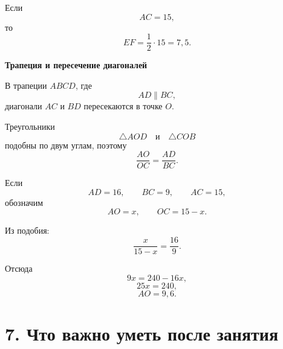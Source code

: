 \documentclass[a4paper,12pt]{article}
\newcommand{\keyidea}[1]{%
    \medskip
    {\color{darkaccent}\bfseries #1}
    \smallskip
}
\begin{document}
Если
\[
AC=15,
\]
то
\[
EF=
\frac12\cdot15
=
\boxed{7{,}5}.
\]

\begin{center}


\end{center}

\keyidea{Трапеция и пересечение диагоналей}

В трапеции \(ABCD\), где
\[
AD\parallel BC,
\]
диагонали \(AC\) и \(BD\) пересекаются в точке \(O\).

Треугольники
\[
\triangle AOD
\quad\text{и}\quad
\triangle COB
\]
подобны по двум углам, поэтому
\[
\boxed{
\frac{AO}{OC}
=
\frac{AD}{BC}
}.
\]

Если
\[
AD=16,\qquad
BC=9,\qquad
AC=15,
\]
обозначим
\[
AO=x,
\qquad
OC=15-x.
\]

Из подобия:
\[
\frac{x}{15-x}
=
\frac{16}{9}.
\]

Отсюда
\[
9x=240-16x,
\]
\[
25x=240,
\]
\[
\boxed{AO=9{,}6}.
\]


\section*{\color{darkaccent}
7. Что важно уметь после занятия
}
\end{document}
